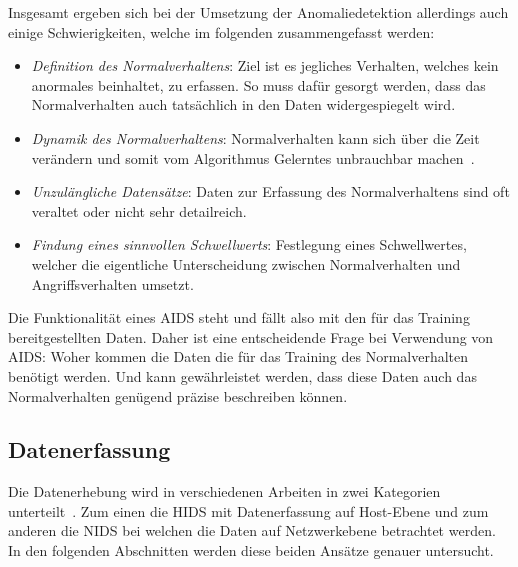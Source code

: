                 Insgesamt ergeben sich bei der Umsetzung der Anomaliedetektion allerdings auch einige Schwierigkeiten, welche im folgenden zusammengefasst werden:

                \begin{itemize}
                    \item \textit{Definition des Normalverhaltens}:
                        Ziel ist es jegliches Verhalten, welches kein anormales beinhaltet, zu erfassen.
                        So muss dafür gesorgt werden,
                        dass das Normalverhalten auch tatsächlich in den Daten widergespiegelt wird. 

                    \item \textit{Dynamik des Normalverhaltens}:
                        Normalverhalten kann sich über die Zeit verändern 
                        und somit vom Algorithmus Gelerntes unbrauchbar machen~\cite{ANOMALYSURVEY}.

                    \item \textit{Unzulängliche Datensätze}:
                        Daten zur Erfassung des Normalverhaltens sind oft veraltet oder nicht sehr detailreich. 

                    \item \textit{Findung eines sinnvollen Schwellwerts}:
                        Festlegung eines Schwellwertes, welcher die eigentliche Unterscheidung zwischen Normalverhalten und Angriffsverhalten umsetzt.
                \end{itemize}

                Die Funktionalität eines \ac{AIDS} steht und fällt also mit den für das Training bereitgestellten Daten.
                Daher ist eine entscheidende Frage bei Verwendung von \ac{AIDS}\@: Woher kommen die Daten die für das Training des Normalverhalten benötigt werden.
                Und kann gewährleistet werden, dass diese Daten auch das Normalverhalten genügend präzise beschreiben können.

        \subsection{Datenerfassung}\label{sec:Datenerfassung}
            Die Datenerhebung wird in verschiedenen Arbeiten in zwei Kategorien unterteilt~\cite{IDSsurvey, IDSreview}.
            Zum einen die \ac{HIDS} mit Datenerfassung auf Host-Ebene und zum anderen die \ac{NIDS} bei welchen die Daten auf Netzwerkebene betrachtet werden.
            In den folgenden Abschnitten werden diese beiden Ansätze genauer untersucht.

